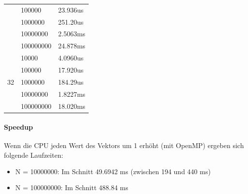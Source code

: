 \documentclass{article}
\begin{document}
\begin{center}
\begin{tabular}{|c|l|l|}
		& 100000    & 23.936us                                                                                   \\ \cline{2-3} 
		& 1000000   & 251.20us                                                                                  \\ \cline{2-3} 
		& 10000000  & 2.5063ms                                                                                  \\ \cline{2-3} 
		& 100000000 & 24.878ms                                                                                 \\ \hline
		\multirow{5}{*}{32}             & 10000     & 4.0960us                                                                                   \\ \cline{2-3} 
		& 100000    & 17.920us                                                                                   \\ \cline{2-3} 
		& 1000000   & 184.29us                                                                                   \\ \cline{2-3} 
		& 10000000  & 1.8227ms                                                                                   \\ \cline{2-3} 
		& 100000000 & 18.020ms                                                                                  \\ \hline
	\end{tabular}
\end{center}

\paragraph{Speedup} 
Wenn die CPU jeden Wert des Vektors um 1 erhöht (mit OpenMP) ergeben sich folgende Laufzeiten:\\
\begin{itemize}
	\item N = 10000000:  Im Schnitt 49.6942 ms (zwischen 194 und 440 ms)
	\item N = 100000000: Im Schnitt 488.84 ms
\end{itemize}
\end{document}
